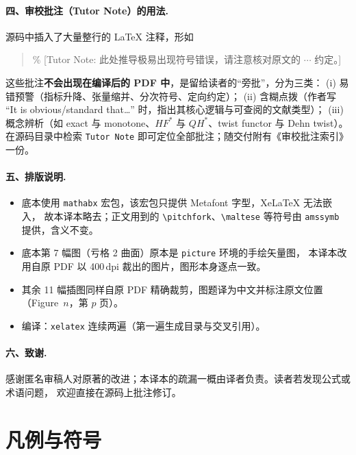 \paragraph{四、审校批注（Tutor Note）的用法.}
源码中插入了大量整行的 LaTeX 注释，形如
\begin{quote}\ttfamily
\% [Tutor Note: 此处推导极易出现符号错误，请注意核对原文的 $\cdots$ 约定。]
\end{quote}
这些批注\textbf{不会出现在编译后的 PDF 中}，是留给读者的“旁批”，分为三类：
(i) 易错预警（指标升降、张量缩并、分次符号、定向约定）；
(ii) 含糊点拨（作者写 “It is obvious/standard that\dots” 时，指出其核心逻辑与可查阅的文献类型）；
(iii) 概念辨析（如 exact 与 monotone、$HF^*$ 与 $QH^*$、twist functor 与 Dehn twist）。
在源码目录中检索 \texttt{Tutor Note} 即可定位全部批注；随交付附有《审校批注索引》一份。

\paragraph{五、排版说明.}
\begin{itemize}
  \item 底本使用 \texttt{mathabx} 宏包，该宏包只提供 Metafont 字型，XeLaTeX 无法嵌入，
        故本译本略去；正文用到的 \texttt{\textbackslash pitchfork}、\texttt{\textbackslash maltese}
        等符号由 \texttt{amssymb} 提供，含义不变。
  \item 底本第 7 幅图（亏格 2 曲面）原本是 \texttt{picture} 环境的手绘矢量图，
        本译本改用自原 PDF 以 400\,dpi 裁出的图片，图形本身逐点一致。
  \item 其余 11 幅插图同样自原 PDF 精确裁剪，图题译为中文并标注原文位置（Figure~$n$，第 $p$ 页）。
  \item 编译：\texttt{xelatex} 连续两遍（第一遍生成目录与交叉引用）。
\end{itemize}

\paragraph{六、致谢.}
感谢匿名审稿人对原著的改进；本译本的疏漏一概由译者负责。读者若发现公式或术语问题，
欢迎直接在源码上批注修订。

\clearpage

\section*{凡例与符号}

